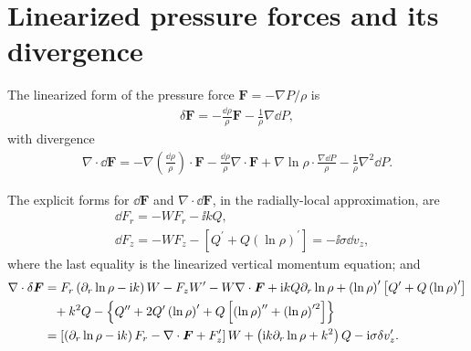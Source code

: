 \section{Linearized pressure forces and its divergence}\label{lin_press}
The linearized form of the pressure force $\bm{F} = -\nabla P/\rho$ is  
\begin{align}
  \delta \bm{F} = - \frac{\dd\rho}{\rho}\bm{F} -
  \frac{1}{\rho}\nabla\dd P,
\end{align}
with divergence
\begin{align}
  \nabla\cdot\dd\bm{F} = -
  \nabla\left(\frac{\dd\rho}{\rho}\right)\cdot\bm{F} -
  \frac{\dd\rho}{\rho}\nabla\cdot\bm{F} +
  \nabla\ln{\rho}\cdot\frac{\nabla\dd P}{\rho} -
  \frac{1}{\rho}\nabla^2\dd P. 
\end{align}


The explicit forms for $\dd\bm{F}$ and $\nabla\cdot\dd\bm{F}$, in the
radially-local approximation, are
\begin{align}
  &\dd F_r = - W F_r - \ii k Q,\\
  &\dd F_z = - W F_z - \left[Q^\prime + Q
    \left(\ln{\rho}\right)^\prime\right]  = - \ii\sigma \dd v_z, 
\end{align} 
where the last equality is the linearized
vertical momentum equation; and 
\begin{align}
  \nabla\cdot\delta\bm{F} &= F_r\left(\partial_r\ln{\rho} - \mathrm{i} k \right)W - F_z
  W^\prime - W \nabla\cdot\bm{F} + \mathrm{i} kQ \partial_r\ln{\rho} +
  \left(\ln{\rho}\right)^\prime\left[Q^\prime + Q
    \left(\ln{\rho}\right)^\prime\right] \notag\\
  & \phantom{=} + k^2 Q - \left\{Q^{\prime\prime} + 2
    Q^\prime\left(\ln{\rho}\right)^\prime
    + Q\left[\left(\ln{\rho}\right)^{\prime\prime}+\left(\ln{\rho}\right)^{\prime
      2}\right]\right\}\notag\\
    &= \left[\left(\partial_r\ln{\rho}-\mathrm{i} k\right)F_r - \nabla\cdot\bm{F} +
      F_z^\prime\right]W + \left(\mathrm{i} k \partial_r\ln{\rho} + k^2\right)Q  -
      \mathrm{i}\sigma \delta v_z^\prime.
\end{align}





